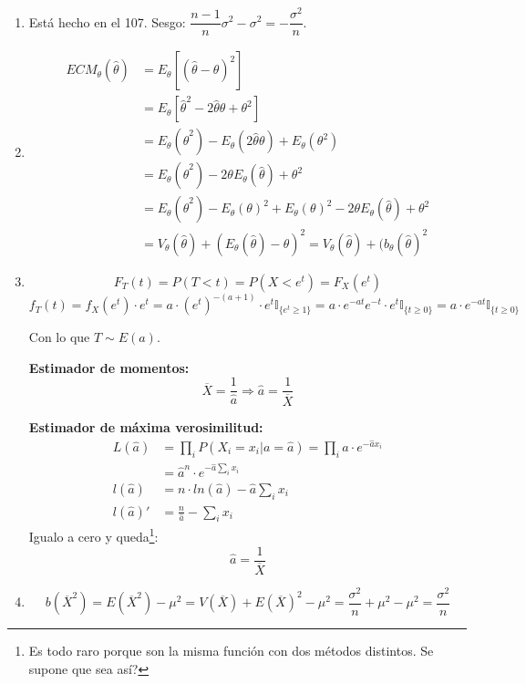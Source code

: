 \begin{enumerate}
	\item
		Está hecho en el 107. Sesgo: $\dfrac{n-1}{n}\sigma^2 - \sigma^2 = -\dfrac{\sigma^2}{n}$.
	\item
		\begin{align*}
			ECM_{\theta}(\hat\theta)	& = E_{\theta} [(\hat\theta - \theta)^2]						\\
										& = E_{\theta} [\hat\theta^2 - 2\hat\theta \theta + \theta^2]	\\
										& = E_{\theta} (\hat\theta^2) - E_{\theta}(2\hat\theta \theta) + E_{\theta}(\theta^2)	\\
										& = E_{\theta} (\hat\theta^2) - 2\theta E_{\theta}(\hat\theta) + \theta^2	\\
										& = E_{\theta} (\hat\theta^2) - E_{\theta}(\theta)^2 + E_{\theta}(\theta)^2 - 2\theta E_{\theta}(\hat\theta) + \theta^2	\\
										& = V_{\theta}(\hat\theta) + (E_{\theta}(\hat\theta)-\theta)^2 = V_{\theta}(\hat\theta) + (b_{\theta}(\hat\theta)^2
		\end{align*}
	
	\item
		$$F_T(t) = P(T<t) = P(X < e^t) = F_X(e^t)$$
		$$f_T(t) = f_X(e^t) \cdot e^t
			= a\cdot (e^t)^{-(a+1)}\cdot e^t \mathbb{I}_{\{e^t \geq 1\}}
			= a\cdot e^{-at} e^{-t} \cdot e^t \mathbb{I}_{\{t \geq 0\}}
			= a\cdot e^{-at} \mathbb{I}_{\{t \geq 0\}}$$
			
		Con lo que $T\sim E(a)$.
		
		\textbf{Estimador de momentos:}
		$$\overline{X} = \frac{1}{\hat a} \Rightarrow \hat a = \frac{1}{\overline X}$$
		
		\textbf{Estimador de máxima verosimilitud:}
		\begin{align*}
			L(\hat a)	& = \prod_i P(X_i = x_i | a = \hat a) = \prod_i \hat a\cdot e^{-\hat a x_i}		\\
						& = \hat a^n \cdot e^{-\hat a \sum_i x_i}										\\
			l(\hat a)	& = n\cdot ln(\hat a) - \hat a \sum_i x_i										\\
			l(\hat a)'	& = \frac{n}{\hat a} - \sum_i x_i
		\end{align*}
		Igualo a cero y queda\footnote{Es todo raro porque son la misma función con dos métodos distintos. Se supone que sea así?}:
		$$\hat a = \frac{1}{\overline X}$$
		
	\item
		$$b(\overline X^2) = E(\overline X^2) - \mu^2 = V(\overline X) + E(\overline X)^2 - \mu^2
			= \frac{\sigma^2}{n} + \mu^2 - \mu^2 = \frac{\sigma^2}{n}$$
			

\end{enumerate}
